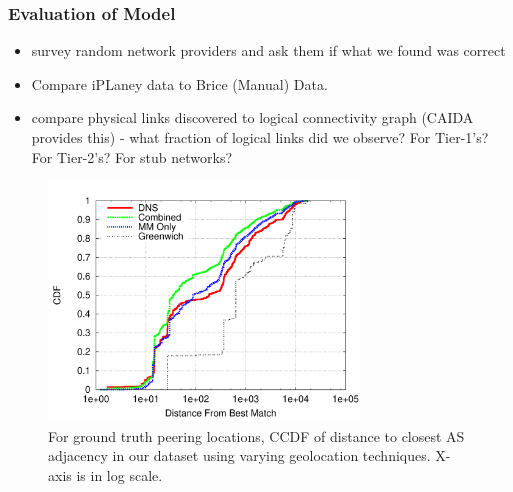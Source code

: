 
        \subsubsection*{Evaluation of Model}
            \begin{itemize}
        \item survey random network providers and ask them if what we
        found was correct
        \item Compare iPLaney data to Brice (Manual) Data.
        \item compare physical links discovered to logical connectivity
        graph (CAIDA provides this) - what fraction of logical links
        did we observe? For Tier-1's? For Tier-2's? For stub networks?
            \end{itemize} 

\begin{figure}[tb]
\centering
\includegraphics[width=3.25in]{graph_all_match_ccdf}
\caption[]{For ground truth peering locations, CCDF of distance to closest AS adjacency in our dataset using varying geolocation techniques. X-axis is in log scale.} 
\end{figure}


